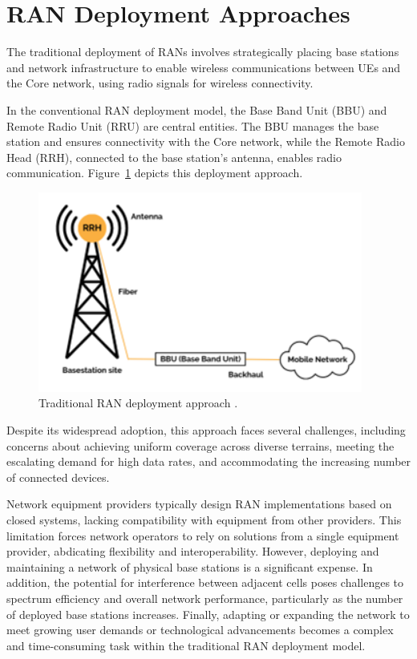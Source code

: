 \section{RAN Deployment Approaches} \label{sec:RAN}
The traditional deployment of RANs involves strategically placing base stations and network infrastructure to enable wireless communications between UEs and the Core network, using radio signals for wireless connectivity.

In the conventional RAN deployment model, the Base Band Unit (BBU) and Remote Radio Unit (RRU) are central entities.
The BBU manages the base station and ensures connectivity with the Core network, while the Remote Radio Head (RRH), connected to the base station's antenna, enables radio communication.
Figure~\ref{fig:rru_bbu} depicts this deployment approach.

\begin{figure}[H]
    \centering
    \includegraphics[width=0.5\linewidth]{figures/RRU_BBU}
    \caption[Traditional RAN deployment approach]{Traditional RAN deployment approach \cite{Trad_RAN}.}
    \label{fig:rru_bbu}
\end{figure}

Despite its widespread adoption, this approach faces several challenges, including concerns about achieving uniform coverage across diverse terrains, meeting the escalating demand for high data rates, and accommodating the increasing number of connected devices.

Network equipment providers typically design RAN implementations based on closed systems, lacking compatibility with equipment from other providers.
This limitation forces network operators to rely on solutions from a single equipment provider, abdicating flexibility and interoperability.
However, deploying and maintaining a network of physical base stations is a significant expense.
In addition, the potential for interference between adjacent cells poses challenges to spectrum efficiency and overall network performance, particularly as the number of deployed base stations increases.
Finally, adapting or expanding the network to meet growing user demands or technological advancements becomes a complex and time-consuming task within the traditional RAN deployment model.

